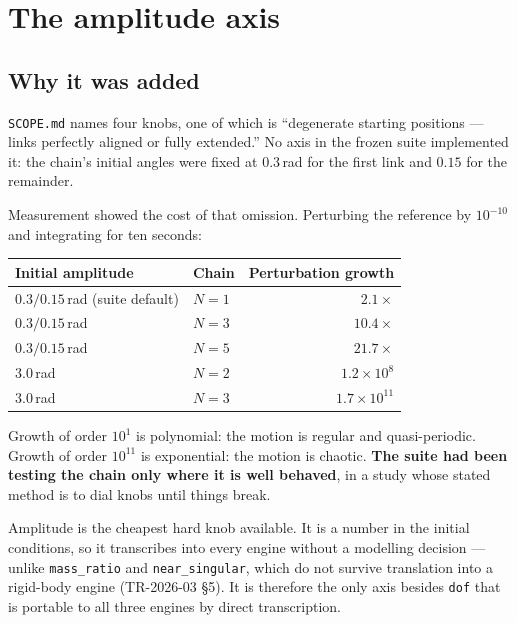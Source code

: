 \documentclass[11pt,a4paper]{article}
\begin{document}
\tableofcontents
\bigskip

\section{The amplitude axis}

\subsection{Why it was added}

\texttt{SCOPE.md} names four knobs, one of which is ``degenerate starting
positions --- links perfectly aligned or fully extended.'' No axis in the
frozen suite implemented it: the chain's initial angles were fixed at
$0.3$\,rad for the first link and $0.15$ for the remainder.

Measurement showed the cost of that omission. Perturbing the reference by
$10^{-10}$ and integrating for ten seconds:

\begin{center}
\begin{tabular}{@{}llr@{}}
\toprule
\textbf{Initial amplitude} & \textbf{Chain} & \textbf{Perturbation growth} \\
\midrule
$0.3 / 0.15$\,rad (suite default) & $N=1$ & $2.1\times$ \\
$0.3 / 0.15$\,rad                 & $N=3$ & $10.4\times$ \\
$0.3 / 0.15$\,rad                 & $N=5$ & $21.7\times$ \\
\midrule
$3.0$\,rad                        & $N=2$ & $1.2\times10^{8}$ \\
$3.0$\,rad                        & $N=3$ & $1.7\times10^{11}$ \\
\bottomrule
\end{tabular}
\end{center}

\noindent Growth of order $10^{1}$ is polynomial: the motion is regular and
quasi-periodic. Growth of order $10^{11}$ is exponential: the motion is
chaotic. \textbf{The suite had been testing the chain only where it is well
behaved}, in a study whose stated method is to dial knobs until things break.

Amplitude is the cheapest hard knob available. It is a number in the initial
conditions, so it transcribes into every engine without a modelling decision
--- unlike \texttt{mass\_ratio} and \texttt{near\_singular}, which do not
survive translation into a rigid-body engine (TR-2026-03 \S5). It is therefore
the only axis besides \texttt{dof} that is portable to all three engines by
direct transcription.
\end{document}

